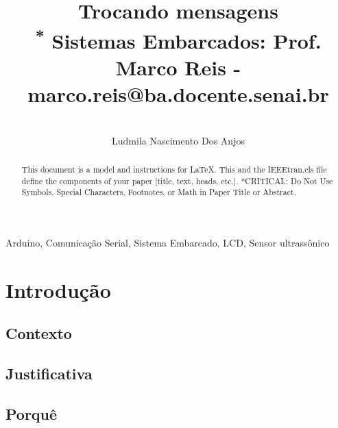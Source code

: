 \documentclass[conference]{IEEEtran}
\begin{document}
\title{Trocando mensagens\\
{\footnotesize \textsuperscript{*} Sistemas Embarcados: Prof. Marco Reis - marco.reis@ba.docente.senai.br}
}


\author{
    \IEEEauthorblockN\centerline{}{Ludmila Nascimento Dos Anjos}
    \and
}
\maketitle

\begin{abstract}
    This document is a model and instructions for \LaTeX.
    This and the IEEEtran.cls file define the components of your paper [title, text, heads, etc.]. *CRITICAL: Do Not Use Symbols, Special Characters, Footnotes,
    or Math in Paper Title or Abstract.
\end{abstract}

\begin{IEEEkeywords}
    Arduino, Comunicação Serial, Sistema Embarcado, LCD, Sensor ultrassônico
\end{IEEEkeywords}

\section{Introdução}

\subsection{Contexto}

\subsection{Justificativa}

\subsection{Porquê}
\end{document}
